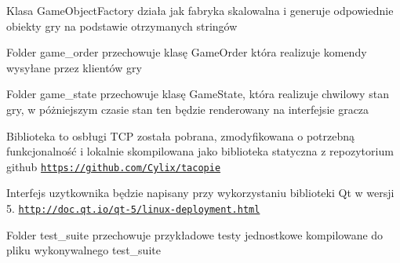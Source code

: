 Klasa Game\+Object\+Factory działa jak fabryka skalowalna i generuje odpowiednie obiekty gry na podstawie otrzymanych stringów
\begin{DoxyItemize}
\item Folder game\+\_\+order przechowuje klasę Game\+Order która realizuje komendy wysyłane przez klientów gry
\item Folder game\+\_\+state przechowuje klasę Game\+State, która realizuje chwilowy stan gry, w póżniejszym czasie stan ten będzie renderowany na interfejsie gracza
\item Biblioteka to osbługi T\+CP została pobrana, zmodyfikowana o potrzebną funkcjonalność i lokalnie skompilowana jako biblioteka statyczna z repozytorium github \href{https://github.com/Cylix/tacopie}{\tt https\+://github.\+com/\+Cylix/tacopie}
\item Interfejs uzytkownika będzie napisany przy wykorzystaniu biblioteki Qt w wersji 5. \href{http://doc.qt.io/qt-5/linux-deployment.html}{\tt http\+://doc.\+qt.\+io/qt-\/5/linux-\/deployment.\+html}
\item Folder test\+\_\+suite przechowuje przykładowe testy jednostkowe kompilowane do pliku wykonywalnego test\+\_\+suite 
\end{DoxyItemize}